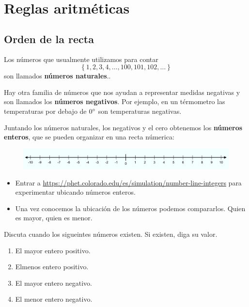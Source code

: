 \chapter{Reglas aritméticas}\label{subseccion_reglas_aritmeticas}

\section{Orden de la recta}\label{subsubsection_orden_de_la_recta}

Los números que usualmente utilizamos para contar 
\[
			\left\{1,2,3,4,\dots,100,101,102,\dots \right\}
\]
son llamados \textbf{números naturales}.. 

Hay otra familia de números que nos ayudan a representar medidas negativas y son llamados los \textbf{números negativos}. Por ejemplo, en un térmometro las temperaturas por debajo de $0\degree$ son temperaturas negativas.

Juntando los números naturales, los negativos y el cero obtenemos los \textbf{números enteros}, que se pueden organizar en una recta númerica:

		\begin{figure}[H]
			\centering
			\includegraphics[width=0.7\linewidth]{Algebra/imgs/recta_numerica}
			\caption{}
			\label{rectanumerica}
		\end{figure}
	
\begin{itemize}
			\item Entrar a \url{https://phet.colorado.edu/es/simulation/number-line-integers} para experimentar ubicando números enteros.
			\item Una vez conocemos la ubicación de los números podemos compararlos. Quien es mayor, quien es menor.
\end{itemize}

\begin{exer}
	Discuta cuando los sigueintes números existen. Si existen, diga su valor.
	\begin{enumerate}[label=\Alph*)]
		\item El mayor entero positivo.
		\item Elmenos entero positivo.
		\item El mayor entero negativo.
		\item El menor entero negativo.
	\end{enumerate}
\end{exer}

